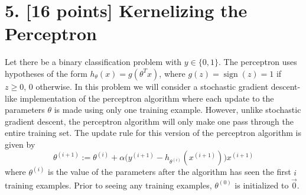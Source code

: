 \documentclass[11pt]{article}
\newcommand{\problem}[2]{\clearpage\section*{#1. #2}}
\begin{document}
\problem{5}{[16 points] Kernelizing the Perceptron}
Let there be a binary classification problem with $y\in\{0,1\}$. The perceptron uses hypotheses of the form $h_\theta(x)=g(\theta^Tx)$, where $g(z)=\operatorname{sign}(z)=1$ if $z\geq0$, $0$ otherwise. In this problem we will consider a stochastic gradient descent-like implementation of the perceptron algorithm where each update to the parameters $\theta$ is made using only one training example. However, unlike stochastic gradient descent, the perceptron algorithm will only make one pass through the entire training set. The update rule for this version of the perceptron algorithm is given by
\[\theta^{(i+1)}:=\theta^{(i)}+\alpha\bigl(y^{(i+1)}-h_{\theta^{(i)}}(x^{(i+1)})\bigr)x^{(i+1)}\]
where $\theta^{(i)}$ is the value of the parameters after the algorithm has seen the first $i$ training examples. Prior to seeing any training examples, $\theta^{(0)}$ is initialized to $\vec{0}$.
\end{document}
